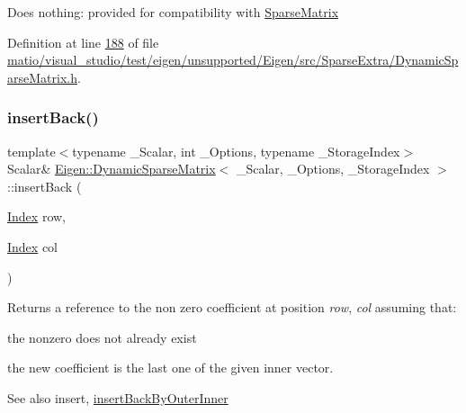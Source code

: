 Does nothing\+: provided for compatibility with \hyperlink{group___sparse_core___module_class_eigen_1_1_sparse_matrix}{Sparse\+Matrix} 

Definition at line \hyperlink{matio_2visual__studio_2test_2eigen_2unsupported_2_eigen_2src_2_sparse_extra_2_dynamic_sparse_matrix_8h_source_l00188}{188} of file \hyperlink{matio_2visual__studio_2test_2eigen_2unsupported_2_eigen_2src_2_sparse_extra_2_dynamic_sparse_matrix_8h_source}{matio/visual\+\_\+studio/test/eigen/unsupported/\+Eigen/src/\+Sparse\+Extra/\+Dynamic\+Sparse\+Matrix.\+h}.

\mbox{\label{class_eigen_1_1_dynamic_sparse_matrix_a0a556652195b91c09e9f6c4d8b7cc81d}} 
\subsubsection{\texorpdfstring{insert\+Back()}{insertBack()}\hspace{0.1cm}{\footnotesize\ttfamily [1/2]}}
{\footnotesize\ttfamily template$<$typename \+\_\+\+Scalar, int \+\_\+\+Options, typename \+\_\+\+Storage\+Index$>$ \\
Scalar\& \hyperlink{class_eigen_1_1_dynamic_sparse_matrix}{Eigen\+::\+Dynamic\+Sparse\+Matrix}$<$ \+\_\+\+Scalar, \+\_\+\+Options, \+\_\+\+Storage\+Index $>$\+::insert\+Back (\begin{DoxyParamCaption}\item[{\hyperlink{group___core___module_a554f30542cc2316add4b1ea0a492ff02}{Index}}]{row,  }\item[{\hyperlink{group___core___module_a554f30542cc2316add4b1ea0a492ff02}{Index}}]{col }\end{DoxyParamCaption})\hspace{0.3cm}{\ttfamily [inline]}}

\begin{DoxyReturn}{Returns}
a reference to the non zero coefficient at position {\itshape row}, {\itshape col} assuming that\+:
\begin{DoxyItemize}
\item the nonzero does not already exist
\item the new coefficient is the last one of the given inner vector.
\end{DoxyItemize}
\end{DoxyReturn}
\begin{DoxySeeAlso}{See also}
insert, \hyperlink{class_eigen_1_1_dynamic_sparse_matrix_ac97c2463058ae55d7f0ef21c851eb5f3}{insert\+Back\+By\+Outer\+Inner} 
\end{DoxySeeAlso}


